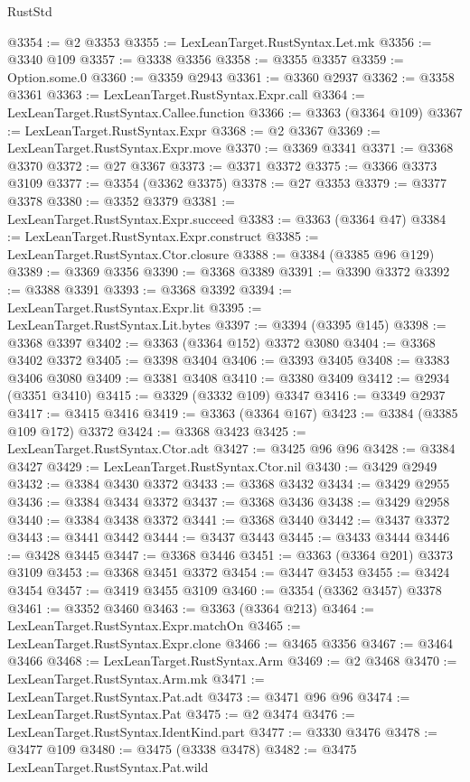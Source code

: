 \begin{lexlean}{RustStd}
\begin{coremodule}
@3354 := @2 @3353
@3355 := LexLeanTarget.RustSyntax.Let.mk
@3356 := @3340 @109
@3357 := @3338 @3356
@3358 := @3355 @3357
@3359 := Option.some.{0}
@3360 := @3359 @2943
@3361 := @3360 @2937
@3362 := @3358 @3361
@3363 := LexLeanTarget.RustSyntax.Expr.call
@3364 := LexLeanTarget.RustSyntax.Callee.function
@3366 := @3363 (@3364 @109)
@3367 := LexLeanTarget.RustSyntax.Expr
@3368 := @2 @3367
@3369 := LexLeanTarget.RustSyntax.Expr.move
@3370 := @3369 @3341
@3371 := @3368 @3370
@3372 := @27 @3367
@3373 := @3371 @3372
@3375 := @3366 @3373 @3109
@3377 := @3354 (@3362 @3375)
@3378 := @27 @3353
@3379 := @3377 @3378
@3380 := @3352 @3379
@3381 := LexLeanTarget.RustSyntax.Expr.succeed
@3383 := @3363 (@3364 @47)
@3384 := LexLeanTarget.RustSyntax.Expr.construct
@3385 := LexLeanTarget.RustSyntax.Ctor.closure
@3388 := @3384 (@3385 @96 @129)
@3389 := @3369 @3356
@3390 := @3368 @3389
@3391 := @3390 @3372
@3392 := @3388 @3391
@3393 := @3368 @3392
@3394 := LexLeanTarget.RustSyntax.Expr.lit
@3395 := LexLeanTarget.RustSyntax.Lit.bytes
@3397 := @3394 (@3395 @145)
@3398 := @3368 @3397
@3402 := @3363 (@3364 @152) @3372 @3080
@3404 := @3368 @3402 @3372
@3405 := @3398 @3404
@3406 := @3393 @3405
@3408 := @3383 @3406 @3080
@3409 := @3381 @3408
@3410 := @3380 @3409
@3412 := @2934 (@3351 @3410)
@3415 := @3329 (@3332 @109) @3347
@3416 := @3349 @2937
@3417 := @3415 @3416
@3419 := @3363 (@3364 @167)
@3423 := @3384 (@3385 @109 @172) @3372
@3424 := @3368 @3423
@3425 := LexLeanTarget.RustSyntax.Ctor.adt
@3427 := @3425 @96 @96
@3428 := @3384 @3427
@3429 := LexLeanTarget.RustSyntax.Ctor.nil
@3430 := @3429 @2949
@3432 := @3384 @3430 @3372
@3433 := @3368 @3432
@3434 := @3429 @2955
@3436 := @3384 @3434 @3372
@3437 := @3368 @3436
@3438 := @3429 @2958
@3440 := @3384 @3438 @3372
@3441 := @3368 @3440
@3442 := @3437 @3372
@3443 := @3441 @3442
@3444 := @3437 @3443
@3445 := @3433 @3444
@3446 := @3428 @3445
@3447 := @3368 @3446
@3451 := @3363 (@3364 @201) @3373 @3109
@3453 := @3368 @3451 @3372
@3454 := @3447 @3453
@3455 := @3424 @3454
@3457 := @3419 @3455 @3109
@3460 := @3354 (@3362 @3457) @3378
@3461 := @3352 @3460
@3463 := @3363 (@3364 @213)
@3464 := LexLeanTarget.RustSyntax.Expr.matchOn
@3465 := LexLeanTarget.RustSyntax.Expr.clone
@3466 := @3465 @3356
@3467 := @3464 @3466
@3468 := LexLeanTarget.RustSyntax.Arm
@3469 := @2 @3468
@3470 := LexLeanTarget.RustSyntax.Arm.mk
@3471 := LexLeanTarget.RustSyntax.Pat.adt
@3473 := @3471 @96 @96
@3474 := LexLeanTarget.RustSyntax.Pat
@3475 := @2 @3474
@3476 := LexLeanTarget.RustSyntax.IdentKind.part
@3477 := @3330 @3476
@3478 := @3477 @109
@3480 := @3475 (@3338 @3478)
@3482 := @3475 LexLeanTarget.RustSyntax.Pat.wild

\end{coremodule}
\end{lexlean}
